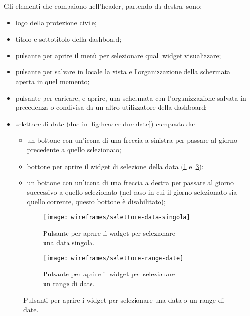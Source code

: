 \documentclass[../../../main.tex]{subfiles}
\begin{document}
Gli elementi che compaiono nell'header, partendo da destra, sono:
\begin{itemize}
    \item logo della protezione civile;
    \item titolo e sottotitolo della dashboard;
    \item pulsante per aprire il menù per selezionare quali widget visualizzare;
    \item pulsante per salvare in locale la vista e l'organizzazione della schermata aperta in quel momento;
    \item pulsante per caricare, e aprire, una schermata con l'organizzazione salvata in precedenza o condivisa da un altro utilizzatore della dashboard;
    \item selettore di date (due in \ref{fig:header-due-date}) composto da:
    \begin{itemize}
        \item un bottone con un'icona di una freccia a sinistra per passare al giorno precedente a quello selezionato;
        \item bottone per aprire il widget di selezione della data (\ref{fig:selettore-data-singola} e~\ref{fig:selettore-range-date});
        \item un bottone con un'icona di una freccia a destra per passare al giorno successivo a quello selezionato (nel caso in cui il giorno selezionato sia quello corrente, questo bottone è disabilitato);
    \end{itemize}
\end{itemize}

\begin{figure}[H]
    \begin{subfigure}[b]{0.5\textwidth}
        \centering
        \texttt{[image: wireframes/selettore-data-singola]}
        \caption{Pulsante per aprire il widget per selezionare\\ una data singola.}\label{fig:selettore-data-singola}
    \end{subfigure}
\hfill
    \begin{subfigure}[b]{0.5\textwidth}
        \centering
        \texttt{[image: wireframes/selettore-range-date]}
        \caption{Pulsante per aprire il widget per selezionare\\un range di date.}\label{fig:selettore-range-date}
    \end{subfigure}
    \caption{Pulsanti per aprire i widget per selezionare una data o un range di date.}
\end{figure}
\end{document}
